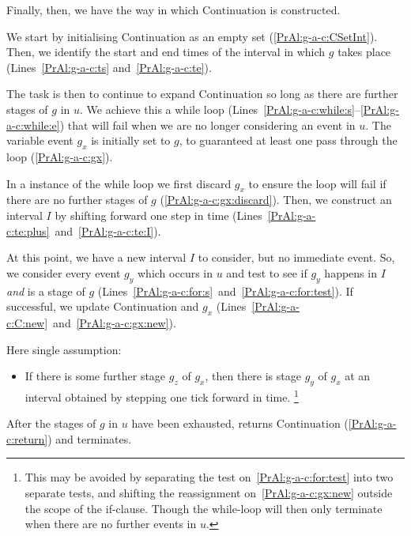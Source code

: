 \begin{note}
  Finally, then, we have the way in which \(\text{Continuation}\) is constructed.

  We start by initialising \(\text{Continuation}\) as an empty set (\autoref{PrAl:g-a-c:CSetInt}).
  Then, we identify the start and end times of the interval in which \(g\) takes place (Lines~\ref{PrAl:g-a-c:ts} and~\ref{PrAl:g-a-c:te}).

  The task is then to continue to expand \(\text{Continuation}\) so long as there are further stages of \(g\) in \(u\).
  We achieve this a while loop %
  (Lines~\ref{PrAl:g-a-c:while:s}--\ref{PrAl:g-a-c:while:e}) %
  that will fail when we are no longer considering an event in \(u\).
  The variable event \(g_{x}\) is initially set to \(g\), to guaranteed at least one pass through the loop (\autoref{PrAl:g-a-c:gx}).

  In a instance of the while loop we first discard \(g_{x}\) to ensure the loop will fail if there are no further stages of \(g\) (\autoref{PrAl:g-a-c:gx:discard}).
  Then, we construct an interval \(I\) by shifting forward one step in time (Lines~\ref{PrAl:g-a-c:te:plus}~and~\ref{PrAl:g-a-c:te:I}).

  At this point, we have a new interval \(I\) to consider, but no immediate event.
  So, we consider every event \(g_{y}\) which occurs in \(u\) and test to see if \(g_{y}\) happens in \(I\) \emph{and} is a stage of \(g\) (Lines~\ref{PrAl:g-a-c:for:s}~and~\ref{PrAl:g-a-c:for:test}).
  If successful, we update \(\text{Continuation}\) and \(g_{x}\) (Lines~\ref{PrAl:g-a-c:C:new}~and~\ref{PrAl:g-a-c:gx:new}).

  Here single assumption:
  \begin{itemize}[noitemsep]
  \item
    If there is some further stage \(g_{z}\) of \(g_{x}\), then there is stage \(g_{y}\) of \(g_{x}\) at an interval obtained by stepping one tick forward in time.%
  \footnote{
    This may be avoided by separating the test on~\autoref{PrAl:g-a-c:for:test} into two separate tests, and shifting the reassignment on~\autoref{PrAl:g-a-c:gx:new} outside the scope of the if-clause.
    Though the while-loop will then only terminate when there are no further events in \(u\).
  }
  \end{itemize}

  After the stages of \(g\) in \(u\) have been exhausted, \AlgAC{} returns \(\text{Continuation}\) (\autoref{PrAl:g-a-c:return}) and terminates.
\end{note}

